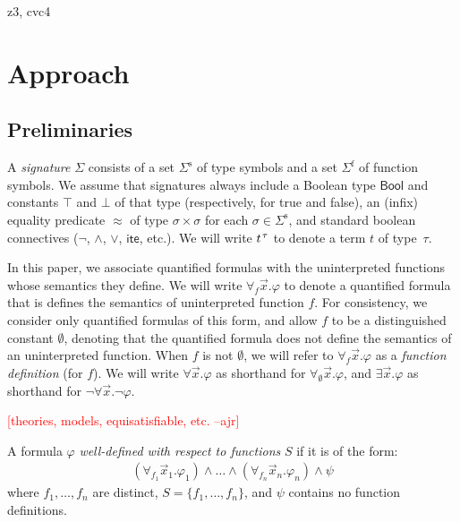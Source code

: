 \documentclass[runningheads,a4paper]{llncs}
\newcommand{\con}[1]{\mathsf{#1}}
\newcommand{\teq}{\approx}
\newcommand{\ssorts}[1]{#1^\mathrm{s}}
\newcommand{\sfuns}[1]{#1^\mathrm{f}}
\newcommand{\Bool}{\con{Bool}}
\newcommand{\ltrue}{\top}
\newcommand{\lfalse}{\bot}
\newcommand{\lite}{\con{ite}}
\newcommand{\forallf}[1]{\forall_{#1}}
\newcommand{\fnull}{\emptyset}
\newcommand{\rem}[1]{\textcolor{red}{[#1]}}
\newcommand{\ajr}[1]{\rem{#1 --ajr}}
\newcommand{\vthinspace}{\kern+0.083333em}
\newcommand{\typ}[1]{^{\vthinspace #1}}
\begin{document}
z3, cvc4


\section{Approach}

\subsection{Preliminaries}
\label{sec:prelim}

A \emph{signature} $\Sigma$ consists of 
a set $\ssorts{\Sigma}$ of type symbols and
a set $\sfuns{\Sigma}$ of function symbols.
We assume that signatures always include a Boolean type $\Bool$ and constants 
$\ltrue$ and $\lfalse$ of that type (respectively, for true and false), 
an (infix) equality predicate $\teq$ of type $\sigma \times \sigma$ for each $\sigma \in \ssorts{\Sigma}$,
and standard boolean connectives ($\neg$, $\wedge$, $\vee$, $\lite$, etc.).
We will write $t\typ{\tau}$ to denote a term $t$ of type~$\tau$.

In this paper, we associate quantified formulas with the uninterpreted functions whose semantics they define.
We will write $\forallf{f} \vec x. \varphi$ to denote a quantified formula that is defines the semantics of uninterpreted function $f$.
For consistency, we consider only quantified formulas of this form, 
and allow $f$ to be a distinguished constant $\fnull$, 
denoting that the quantified formula does not define the semantics of an uninterpreted function.
When $f$ is not $\fnull$, we will refer to $\forallf{f} \vec x. \varphi$ as a \emph{function definition} (for $f$).
We will write $\forall \vec x. \varphi$ as shorthand for $\forallf{\fnull} \vec x. \varphi$,
and $\exists \vec x. \varphi$ as shorthand for $\neg \forall \vec x. \neg \varphi$.

\ajr{theories, models, equisatisfiable, etc.}


\begin{definition}
A formula $\varphi$ \emph{well-defined with respect to functions} $S$ if it is of the form:
\begin{eqnarray} \label{eq:wdf}
(\forallf{f_1} \vec x_1. \varphi_1) \wedge \ldots \wedge (\forallf{f_n} \vec x_n. \varphi_n) \wedge \psi
\end{eqnarray}
where $f_1, \ldots, f_n$ are distinct, 
$S = \{ f_1, \ldots, f_n \}$,
and $\psi$ contains no function definitions.
\end{definition}
\end{document}
